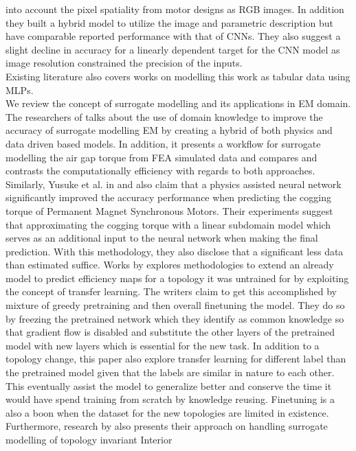 \documentclass{report} %
\begin{document}
into account the pixel spatiality from motor designs as RGB images. In addition they built a hybrid model to utilize the image and parametric 
description but have comparable reported performance with that of \ac{CNN}s.
They also suggest a slight decline in accuracy for a linearly dependent target for the \ac{CNN} model as image resolution constrained the precision of the inputs.\\
Existing literature also covers works on modelling this work as tabular data using \ac{MLP}s. \\
We review the concept of surrogate modelling and its applications in \ac{EM} domain.
The researchers of \cite{SM EMT-2020} talks about the use of domain knowledge to improve the accuracy of surrogate modelling \ac{EM} by creating a hybrid of both 
physics and data driven based models.
In addition, it presents a workflow for surrogate modelling the air gap torque from \ac{FEA} simulated data and compares and contrasts the computationally efficiency with regards to both approaches. 
Similarly, Yusuke et al. in \cite{PANN-MT-2021} and \cite{PANN-MOO-2021} also claim that a physics assisted neural network significantly improved the accuracy performance when predicting the cogging torque 
of Permanent Magnet Synchronous Motors. Their experiments suggest that approximating the cogging torque with a linear subdomain model which serves as an additional 
input to the neural network when making the final prediction. With this methodology, they also disclose that a significant less data than estimated suffice.
Works by \cite{EM TL-2020} explores methodologies to extend an already model to predict efficiency maps for a topology it was untrained for by exploiting 
the concept of transfer learning. The writers claim to get this accomplished by mixture of greedy pretraining and then overall finetuning the model.
They do so by freezing the pretrained network which they identify as common knowledge so that gradient flow is disabled and substitute the other 
layers of the pretrained model with new layers which is essential for the new task.
In addition to a topology change, this paper also explore transfer learning for different label than the pretrained model given that the labels are similar in nature to each other. 
This eventually assist the model to generalize better and conserve the time it would have spend training from scratch by knowledge reusing. 
Finetuning is a also a boon when the dataset for the new topologies are limited in existence.\\
Furthermore, research by \cite{EM CNN-2024} also presents their approach on handling surrogate modelling of topology invariant Interior 
\end{document}
